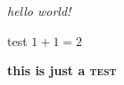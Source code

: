 \documentclass[ngerman]{letter}
\begin{document}
\textit{hello world!}

test $1+1=2$

\textbf{this is just a \textsc{test}}
\end{document}
